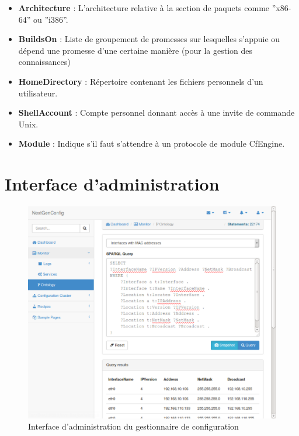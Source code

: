 \begin{itemize}
  \item \textbf{Architecture} : L'architecture relative à la section de paquets
	  comme ''x86-64'' ou ''i386''.
  \item \textbf{BuildsOn} : Liste de groupement de promesses sur lesquelles
	  s'appuie ou dépend une promesse d'une certaine manière (pour la
	  gestion des connaissances)
  \item \textbf{HomeDirectory} : Répertoire contenant les fichiers personnels
	  d'un utilisateur.
  \item \textbf{ShellAccount} : Compte personnel donnant accès à une invite de
	  commande Unix.
  \item \textbf{Module} : Indique s'il faut s'attendre à un protocole de module
	  CfEngine.
\end{itemize}

\chapter{Interface d'administration}
\label{appendix:interface}

\begin{figure}[H]
    \centerline{\includegraphics[width=\textwidth]{img/trifle_gui}}
    \caption{Interface d'administration du gestionnaire de configuration}
    \label{fig:trifle_gui}
\end{figure}

